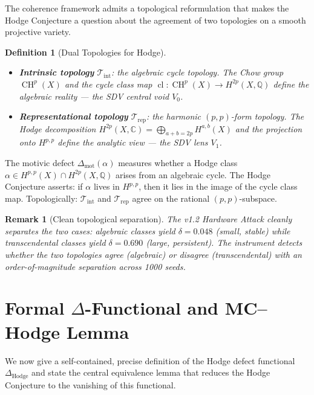 \documentclass[11pt]{article}
\newtheorem{definition}[theorem]{Definition}
\newtheorem{remark}[theorem]{Remark}
\theoremstyle{definition}
\begin{document}
The coherence framework admits a topological reformulation that makes
the Hodge Conjecture a question about the agreement of two topologies
on a smooth projective variety.

\begin{definition}[Dual Topologies for Hodge]
\label{def:hodge-topo}
\mbox{}
\begin{itemize}
\item \textbf{Intrinsic topology} $\mathcal{T}_{\mathrm{int}}$:
the algebraic cycle topology.  The Chow group $\operatorname{CH}^p(X)$
and the cycle class map $\operatorname{cl}: \operatorname{CH}^p(X)
\to H^{2p}(X, \mathbb{Q})$ define the algebraic reality --- the SDV
central void $V_0$.
\item \textbf{Representational topology} $\mathcal{T}_{\mathrm{rep}}$:
the harmonic $(p,p)$-form topology.  The Hodge decomposition
$H^{2p}(X, \mathbb{C}) = \bigoplus_{a+b=2p} H^{a,b}(X)$ and the
projection onto $H^{p,p}$ define the analytic view --- the SDV
lens $V_1$.
\end{itemize}
\end{definition}

\noindent
The motivic defect $\Delta_{\mathrm{mot}}(\alpha)$ measures whether
a Hodge class $\alpha \in H^{p,p}(X) \cap H^{2p}(X, \mathbb{Q})$
arises from an algebraic cycle.  The Hodge Conjecture asserts: if
$\alpha$ lives in $H^{p,p}$, then it lies in the image of the cycle
class map.  Topologically: $\mathcal{T}_{\mathrm{int}}$ and
$\mathcal{T}_{\mathrm{rep}}$ agree on the rational $(p,p)$-subspace.

\begin{remark}[Clean topological separation]
The v1.2 Hardware Attack cleanly separates the two cases:
algebraic classes yield $\delta = 0.048$ (small, stable) while
transcendental classes yield $\delta = 0.690$ (large, persistent).
The instrument detects whether the two topologies agree (algebraic)
or disagree (transcendental) with an order-of-magnitude separation
across 1000 seeds.
\end{remark}

\section{Formal $\Delta$-Functional and MC--Hodge Lemma}
\label{sec:delta-functional}

We now give a self-contained, precise definition of the Hodge defect
functional $\Delta_{\mathrm{Hodge}}$ and state the central equivalence
lemma that reduces the Hodge Conjecture to the vanishing of this
functional.
\end{document}

